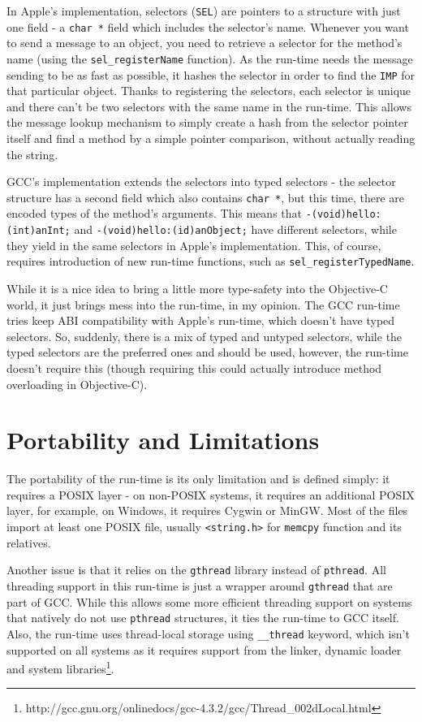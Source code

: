 In Apple's implementation, selectors (\verb=SEL=) are pointers to a structure with just one field - a \verb=char *= field which includes the selector's name. Whenever you want to send a message to an object, you need to retrieve a selector for the method's name (using the \verb=sel_registerName= function). As the run-time needs the message sending to be as fast as possible, it hashes the selector in order to find the \verb=IMP= for that particular object. Thanks to registering the selectors, each selector is unique and there can't be two selectors with the same name in the run-time. This allows the message lookup mechanism to simply create a hash from the selector pointer itself and find a method by a simple pointer comparison, without actually reading the string.

GCC's implementation extends the selectors into typed selectors - the selector structure has a second field which also contains \verb=char *=, but this time, there are encoded types of the method's arguments. This means that \verb=-(void)hello:(int)anInt;= and \verb=-(void)hello:(id)anObject;= have different selectors, while they yield in the same selectors in Apple's implementation. This, of course, requires introduction of new run-time functions, such as \verb=sel_registerTypedName=.

While it is a nice idea to bring a little more type-safety into the Objective-C world, it just brings mess into the run-time, in my opinion. The GCC run-time tries keep ABI compatibility with Apple's run-time, which doesn't have typed selectors. So, suddenly, there is a mix of typed and untyped selectors, while the typed selectors are the preferred ones and should be used, however, the run-time doesn't require this (though requiring this could actually introduce method overloading in Objective-C).

\section{Portability and Limitations}

The portability of the run-time is its only limitation and is defined simply: it requires a POSIX layer - on non-POSIX systems, it requires an additional POSIX layer, for example, on Windows, it requires Cygwin or MinGW. Most of the files import at least one POSIX file, usually \verb=<string.h>= for \verb=memcpy= function and its relatives.

Another issue is that it relies on the \verb=gthread= library instead of \verb=pthread=. All threading support in this run-time is just a wrapper around \verb=gthread= that are part of GCC. While this allows some more efficient threading support on systems that natively do not use \verb=pthread= structures, it ties the run-time to GCC itself. Also, the run-time uses thread-local storage using \verb=__thread= keyword, which isn't supported on all systems as it requires support from the linker, dynamic loader and system libraries\footnote{http://gcc.gnu.org/onlinedocs/gcc-4.3.2/gcc/Thread\_002dLocal.html}.
